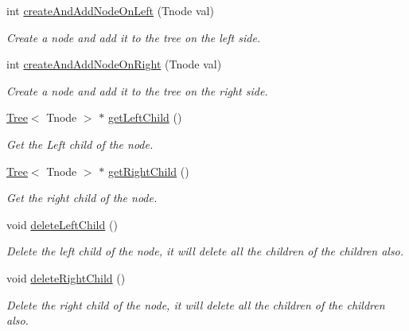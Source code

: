 \begin{DoxyCompactItemize}
\item 
int \hyperlink{classTree_a278f7564b09dc1600dcdb0cc4d3054a0}{create\+And\+Add\+Node\+On\+Left} (Tnode val)\hypertarget{classTree_a278f7564b09dc1600dcdb0cc4d3054a0}{}\label{classTree_a278f7564b09dc1600dcdb0cc4d3054a0}

\begin{DoxyCompactList}\small\item\em Create a node and add it to the tree on the left side. \end{DoxyCompactList}\item 
int \hyperlink{classTree_a44eb3341bc7ed66f255e9fe468ab06eb}{create\+And\+Add\+Node\+On\+Right} (Tnode val)\hypertarget{classTree_a44eb3341bc7ed66f255e9fe468ab06eb}{}\label{classTree_a44eb3341bc7ed66f255e9fe468ab06eb}

\begin{DoxyCompactList}\small\item\em Create a node and add it to the tree on the right side. \end{DoxyCompactList}\item 
\hyperlink{classTree}{Tree}$<$ Tnode $>$ $\ast$ \hyperlink{classTree_ae3f7bd77cb5a97850610d8467e92b4a6}{get\+Left\+Child} ()\hypertarget{classTree_ae3f7bd77cb5a97850610d8467e92b4a6}{}\label{classTree_ae3f7bd77cb5a97850610d8467e92b4a6}

\begin{DoxyCompactList}\small\item\em Get the Left child of the node. \end{DoxyCompactList}\item 
\hyperlink{classTree}{Tree}$<$ Tnode $>$ $\ast$ \hyperlink{classTree_acc04c93b0cead87c1cf2ddcaadcc3753}{get\+Right\+Child} ()\hypertarget{classTree_acc04c93b0cead87c1cf2ddcaadcc3753}{}\label{classTree_acc04c93b0cead87c1cf2ddcaadcc3753}

\begin{DoxyCompactList}\small\item\em Get the right child of the node. \end{DoxyCompactList}\item 
void \hyperlink{classTree_aa3d6fdeadd512395b1e2511dfc45936d}{delete\+Left\+Child} ()\hypertarget{classTree_aa3d6fdeadd512395b1e2511dfc45936d}{}\label{classTree_aa3d6fdeadd512395b1e2511dfc45936d}

\begin{DoxyCompactList}\small\item\em Delete the left child of the node, it will delete all the children of the children also. \end{DoxyCompactList}\item 
void \hyperlink{classTree_a6e3a484d9f7f10a3897502f77bd1532a}{delete\+Right\+Child} ()\hypertarget{classTree_a6e3a484d9f7f10a3897502f77bd1532a}{}\label{classTree_a6e3a484d9f7f10a3897502f77bd1532a}

\begin{DoxyCompactList}\small\item\em Delete the right child of the node, it will delete all the children of the children also. \end{DoxyCompactList}\end{DoxyCompactItemize}
